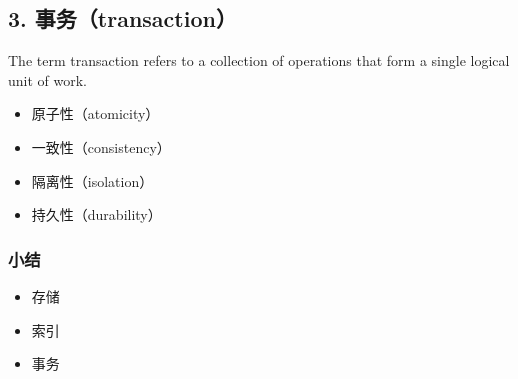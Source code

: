 \documentclass[aspectratio=169, 14pt]{beamer}
\begin{document}
\begin{frame}
    \section{\textcolor{darkmidnightblue}{3. 事务（transaction）}}
The term \alert{transaction} refers to a collection of operations that form a single logical unit of work. 
    \begin{itemize}
        \item 原子性（atomicity）
        \item 一致性（consistency）
        \item 隔离性（isolation）
        \item 持久性（durability）
    \end{itemize}

\end{frame}

\begin{frame}
    \frametitle{小结}

\begin{itemize}
    \item 存储
    \item 索引
    \item 事务
\end{itemize}

\end{frame}
\end{document}
